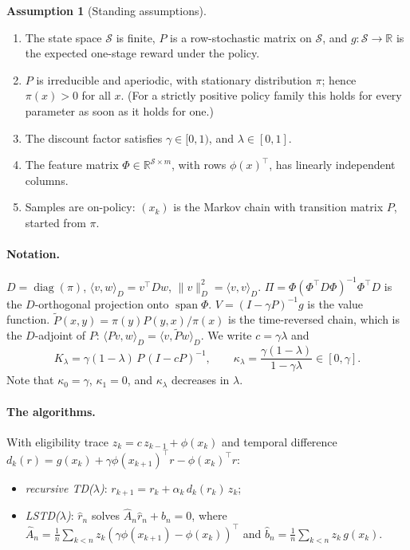 \documentclass[11pt]{article}
\theoremstyle{definition}
\newtheorem{assumption}[theorem]{Assumption}
\theoremstyle{remark}
\newcommand{\R}{\mathbb{R}}
\newcommand{\X}{\mathcal{S}}
\newcommand{\inner}[2]{\langle #1, #2\rangle}
\DeclareMathOperator{\spn}{span}
\begin{document}
\begin{assumption}[Standing assumptions]\label{ass:standing}
\begin{enumerate}
\item The state space $\X$ is finite, $P$ is a row-stochastic matrix on $\X$, and
  $g : \X \to \R$ is the expected one-stage reward under the policy.
\item $P$ is irreducible and aperiodic, with stationary distribution $\pi$; hence
  $\pi(x) > 0$ for all $x$. (For a strictly positive policy family this holds for
  every parameter as soon as it holds for one.)
\item The discount factor satisfies $\gamma \in [0,1)$, and $\lambda \in [0,1]$.
\item The feature matrix $\Phi \in \R^{\X \times m}$, with rows $\phi(x)^\top$, has
  linearly independent columns.
\item Samples are on-policy: $(x_k)$ is the Markov chain with transition matrix $P$,
  started from $\pi$.
\end{enumerate}
\end{assumption}

\paragraph{Notation.} $D = \operatorname{diag}(\pi)$,
$\inner{v}{w}_D = v^\top D w$, $\|v\|_D^2 = \inner{v}{v}_D$.
$\Pi = \Phi(\Phi^\top D\Phi)^{-1}\Phi^\top D$ is the $D$-orthogonal projection onto
$\spn\Phi$. $V = (I - \gamma P)^{-1} g$ is the value function.
$\tilde P(x,y) = \pi(y)P(y,x)/\pi(x)$ is the time-reversed chain, which is the
$D$-adjoint of $P$: $\inner{Pv}{w}_D = \inner{v}{\tilde Pw}_D$.
We write $c = \gamma\lambda$ and
\[
  K_\lambda = \gamma(1-\lambda)\, P\,(I - cP)^{-1}, \qquad
  \kappa_\lambda = \frac{\gamma(1-\lambda)}{1-\gamma\lambda} \in [0,\gamma].
\]
Note that $\kappa_0 = \gamma$, $\kappa_1 = 0$, and $\kappa_\lambda$ decreases in $\lambda$.

\paragraph{The algorithms.} With eligibility trace $z_k = c\, z_{k-1} + \phi(x_k)$
and temporal difference $d_k(r) = g(x_k) + \gamma\phi(x_{k+1})^\top r - \phi(x_k)^\top r$:
\begin{itemize}
\item \emph{recursive TD($\lambda$)}: $r_{k+1} = r_k + \alpha_k\, d_k(r_k)\, z_k$;
\item \emph{LSTD($\lambda$)}: $\hat r_n$ solves $\hat A_n \hat r_n + \hat b_n = 0$, where
  $\hat A_n = \frac1n\sum_{k<n} z_k(\gamma\phi(x_{k+1}) - \phi(x_k))^\top$ and
  $\hat b_n = \frac1n\sum_{k<n} z_k\, g(x_k)$.
\end{itemize}
\end{document}
